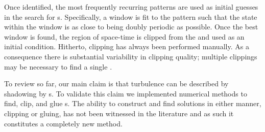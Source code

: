 Once identified, the most frequently recurring patterns are used
as initial guesses in the search for {\fpo}s. Specifically, a {\spt} window is
fit to the pattern such that the state within the window is as close to being
doubly periodic as possible. Once the best window is found, the region of space-time
is clipped from the {\po} and used as an initial condition.
Hitherto, clipping has always been performed manually. As a consequence there
is substantial variability in clipping quality;
multiple clippings may be necessary to find a single {\fpo}.









To review so far, our main claim is that turbulence can be described by
shadowing by {\fpo}s. To validate this claim we implemented
numerical methods to find, clip, and glue {\po}s.
The ability to construct and find solutions in either manner, clipping or gluing,
has not been witnessed in the literature and as such it
constitutes a completely new method.
